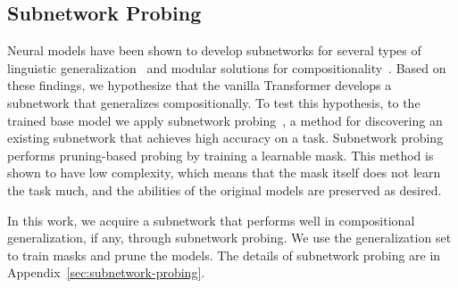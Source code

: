 \subsection{Subnetwork Probing}
\label{subsec:subnetwork-probing}
Neural models have been shown to develop subnetworks for several types of linguistic generalization~\citep{bhaskar-etal-2024-heuristic, ahuja2024learningsyntaxplantingtrees} and modular solutions for compositionality~\citep{lepori2023break}.
Based on these findings, we hypothesize that the vanilla Transformer develops a subnetwork that generalizes compositionally.
To test this hypothesis, to the trained base model we apply subnetwork probing~\citep{cao-etal-2021-low}, a method for discovering an existing subnetwork that achieves high accuracy on a task.
Subnetwork probing performs pruning-based probing by training a learnable mask.
This method is shown to have low complexity, which means that the mask itself does not learn the task much, and the abilities of the original models are preserved as desired.

In this work, we acquire a subnetwork that performs well in compositional generalization, if any, through subnetwork probing.
We use the generalization set to train masks and prune the models.
The details of subnetwork probing are in Appendix~\ref{sec:subnetwork-probing}.



